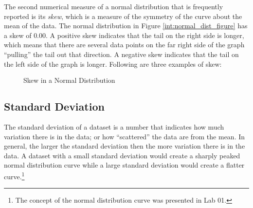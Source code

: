 The second numerical measure of a normal distribution that is frequently reported is its \textit{skew}, which is a measure of the symmetry of the curve about the mean of the data. The normal distribution in Figure \ref{int:normal_dist_figure} has a skew of $ 0.00 $. A positive skew indicates that the tail on the right side is longer, which means that there are several data points on the far right side of the graph ``pulling'' the tail out that direction. A negative skew indicates that the tail on the left side of the graph is longer. Following are three examples of skew:

\begin{figure}[H]
  \begin{center}
  \end{center}
  \caption{Skew in a Normal Distribution}
  \label{lab03_fig03}
\end{figure}

\subsection{Standard Deviation}\label{lab03_standard_deviation}

The standard deviation of a dataset is a number that indicates how much variation there is in the data; or how ``scattered'' the data are from the mean. In general, the larger the standard deviation then the more variation there is in the data. A dataset with a small standard deviation would create a sharply peaked normal distribution curve while a large standard deviation would create a flatter curve.\footnote{The concept of the normal distribution curve was presented in Lab 01.}

